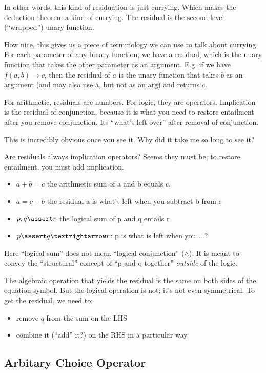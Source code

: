 \documentclass{article}
\begin{document}
In other words, this kind of residuation is just currying. Which makes
the deduction theorem a kind of currying. The residual is the
second-level (``wrapped'') unary function.

How nice, this gives us a piece of terminology we can use to talk
about currying. For each parameter of any binary function, we have a
residual, which is the unary function that takes the other parameter
as an argument. E.g. if we have \(f(a,b)→c\), then the residual of
\(a\) is the unary function that takes \(b\) as an argument (and may
also use a, but not as an arg) and returns \(c\).

For arithmetic, residuals are numbers. For logic, they are operators.
Implication is the residual of conjunction, because it is what you
need to restore entailment after you remove conjunction. Its ``what's
left over'' after removal of conjunction.

This is incredibly obvious once you see it. Why did it take me so long
to see it?

Are residuals always implication operators? Seems they must be; to
restore entailment, you must add implication.

\begin{itemize}
\item \(a + b = c\) the arithmetic sum of a and b equals c.
\item \(a = c - b\) the residual a is what's left when you subtract b from c
\item \(p,q\linfer r\) the logical sum of p and q entails r
\item \(p\linfer q→r\): p is what is left when you ...?
\end{itemize}

Here ``logical sum'' does not mean ``logical conjunction''
(\(\land\)). It is meant to convey the ``structural'' concept of ``p and
q together'' \textit{outside} of the logic.

The algebraic operation that yields the residual is the same on both
sides of the equation symbol. But the logical operation is not; it's
not even symmetrical.  To get the residual, we need to:

\begin{itemize}
\item remove \(q\) from the sum on the LHS
\item combine it (``add'' it?) on the RHS in a particular way
\end{itemize}

\subsection{Arbitary Choice Operator}
\end{document}
